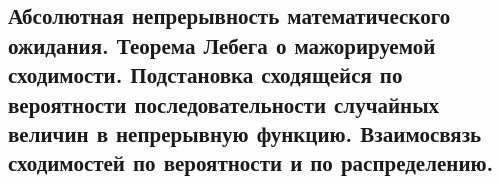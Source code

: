 \subsection{Абсолютная непрерывность математического ожидания. Теорема Лебега о мажорируемой сходимости. Подстановка сходящейся по вероятности последовательности случайных величин в непрерывную функцию. Взаимосвязь сходимостей по вероятности и по распределению.}